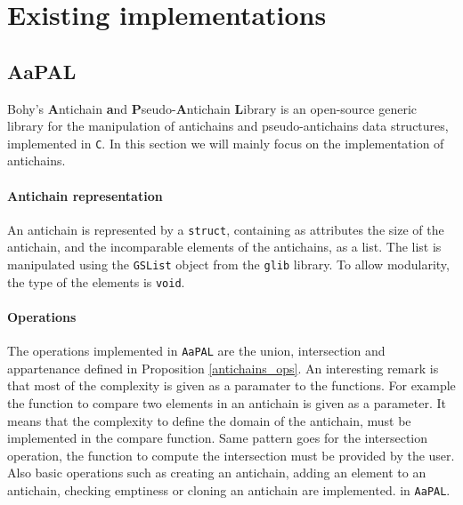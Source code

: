 \documentclass[letterpaper]{article}
\theoremstyle{definition}
\begin{document}
\newpage


\section{Existing implementations}


\subsection{AaPAL}


Bohy's \textbf{A}ntichain
\textbf{a}nd \textbf{P}seudo-\textbf{A}ntichain \textbf{L}ibrary \cite{aapal}
is an open-source generic library for the manipulation
of antichains and pseudo-antichains data structures,
implemented in \texttt{C}. In this section we will mainly focus
on the implementation of antichains.


\paragraph{Antichain representation}

An antichain is represented by a \texttt{struct}, containing as attributes
the size of the antichain, and the incomparable elements of the antichains,
as a list. The list is manipulated using the \texttt{GSList} object
from the \texttt{glib} library.
To allow modularity, the type of the elements
is \texttt{void}.

\paragraph{Operations}

The operations implemented in \texttt{AaPAL}
are the union, intersection and appartenance
defined in Proposition \ref{antichains_ops}.
An interesting remark is that most of the complexity is given as a paramater
to the functions. For example the function to compare two elements in
an antichain is given as a parameter. It means that the complexity to define
the domain of the antichain, must be implemented in the compare function.
Same pattern goes for the intersection operation,
the function to compute the intersection must be provided by the user.
Also basic
operations such as creating an antichain,
adding an element to
an antichain, checking emptiness or cloning an antichain are implemented.
in \texttt{AaPAL}.
\end{document}
